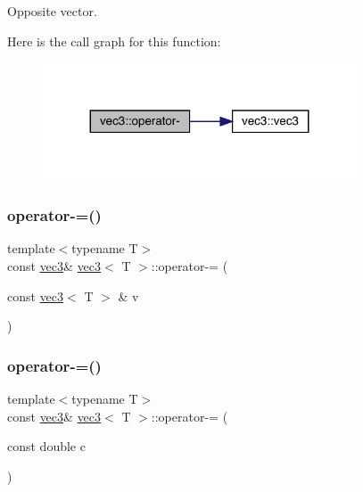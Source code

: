 Opposite vector. 

Here is the call graph for this function\+:\nopagebreak
\begin{figure}[H]
\begin{center}
\leavevmode
\includegraphics[width=263pt]{structvec3_a9ee0d5d83bd70141b9424928d0ea9c98_cgraph}
\end{center}
\end{figure}
\mbox{\label{structvec3_a6302bef90ffb5d572b9d452d902266c5}} 
\subsubsection{\texorpdfstring{operator-\/=()}{operator-=()}\hspace{0.1cm}{\footnotesize\ttfamily [1/2]}}
{\footnotesize\ttfamily template$<$typename T$>$ \\
const \mbox{\hyperlink{structvec3}{vec3}}\& \mbox{\hyperlink{structvec3}{vec3}}$<$ T $>$\+::operator-\/= (\begin{DoxyParamCaption}\item[{const \mbox{\hyperlink{structvec3}{vec3}}$<$ T $>$ \&}]{v }\end{DoxyParamCaption})\hspace{0.3cm}{\ttfamily [inline]}}

\mbox{\label{structvec3_aef8422b6e70a53e4c10df464bb24507c}} 
\subsubsection{\texorpdfstring{operator-\/=()}{operator-=()}\hspace{0.1cm}{\footnotesize\ttfamily [2/2]}}
{\footnotesize\ttfamily template$<$typename T$>$ \\
const \mbox{\hyperlink{structvec3}{vec3}}\& \mbox{\hyperlink{structvec3}{vec3}}$<$ T $>$\+::operator-\/= (\begin{DoxyParamCaption}\item[{const double}]{c }\end{DoxyParamCaption})\hspace{0.3cm}{\ttfamily [inline]}}

